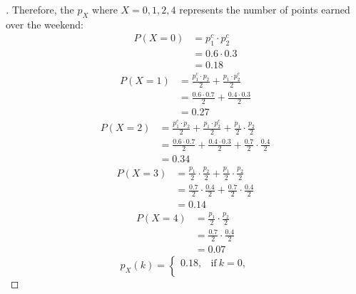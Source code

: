 \documentclass[paper=usletter, fontsize=12pt]{article}
\begin{document}
\begin{enumerate}
\begin{proof}[\unskip\nopunct]
            Therefore, the $p_X$ where $X=0,1,2,4$ represents the number of points earned over the weekend:
            \begin{align*}
                P(X=0) & = p_1^c \cdot p_2^c\\
                & = 0.6 \cdot 0.3\\
                & = 0.18
            \end{align*}
            \begingroup
            \addtolength{\jot}{1em}
            \begin{align*}
                P(X=1) & = \frac{p_1^c \cdot p_2}{2} + \frac{p_1 \cdot
                p_2^c}{2}\\
                & = \frac{0.6 \cdot 0.7}{2} + \frac{0.4 \cdot 0.3}{2}\\
                & = 0.27
            \end{align*}
            \endgroup
            \begingroup
            \addtolength{\jot}{1em}
            \begin{align*}
                P(X=2) & = \frac{p_1^c \cdot p_2}{2} + \frac{p_1 \cdot
                p_2^c}{2} + \frac{p_1}{2} \cdot \frac{p_2}{2}\\
                & = \frac{0.6 \cdot 0.7}{2} + \frac{0.4 \cdot 0.3}{2} + \frac{0.7}{2} \cdot \frac{0.4}{2}\\
                & = 0.34
            \end{align*}
            \endgroup
            \begingroup
            \addtolength{\jot}{1em}
            \begin{align*}
                P(X=3) & = \frac{p_1}{2} \cdot \frac{p_2}{2} + \frac{p_1}{2} \cdot \frac{p_2}{2}\\
                & = \frac{0.7}{2} \cdot \frac{0.4}{2} + \frac{0.7}{2} \cdot \frac{0.4}{2}\\
                & = 0.14
            \end{align*}
            \endgroup
            \begingroup
            \addtolength{\jot}{1em}
            \begin{align*}
                P(X=4) & = \frac{p_1}{2} \cdot \frac{p_2}{2}\\
                & = \frac{0.7}{2} \cdot \frac{0.4}{2}\\
                & = 0.07
            \end{align*}
            \endgroup
            \begin{equation*}
                p_X(k) =
                \begin{cases}
                    0.18, & \text{if}\ k = 0,\\

\end{cases}
\end{equation*}
\end{proof}
\end{enumerate}
\end{document}

